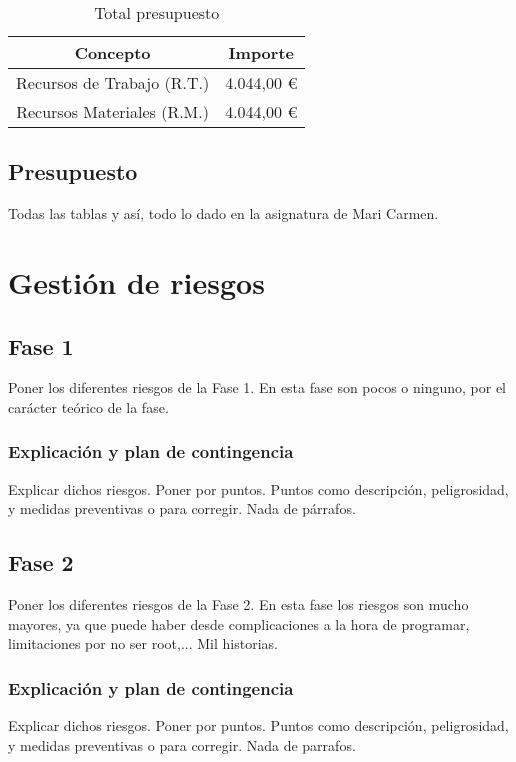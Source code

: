 \begin{table}[H]
	\centering
	\begin{tabular}{ |c|c| } 
		\hline
		Concepto & Importe \\
		\hline
		Recursos de Trabajo (R.T.) & 4.044,00 \euro \\
		Recursos Materiales (R.M.) & 4.044,00 \euro \\
		\hline
	\end{tabular}
	\caption{Total presupuesto}
	\label{table:total-presupuesto}
\end{table}

\subsection{Presupuesto}
{\color{red} Todas las tablas y así, todo lo dado en la asignatura de Mari Carmen.}


\section{Gestión de riesgos}

\subsection{Fase 1}
{\color{red} Poner los diferentes riesgos de la Fase 1. En esta fase son pocos o ninguno, por el carácter teórico de la fase.}

\subsubsection{Explicación y plan de contingencia}
{\color{red} Explicar dichos riesgos. Poner por puntos. Puntos como descripción, peligrosidad, y medidas preventivas o para corregir. Nada de párrafos.}

\subsection{Fase 2}
{\color{red} Poner los diferentes riesgos de la Fase 2. En esta fase los riesgos son mucho mayores, ya que puede haber desde complicaciones a la hora de programar, limitaciones por no ser root,... Mil historias.}

\subsubsection{Explicación y plan de contingencia}
{\color{red} Explicar dichos riesgos. Poner por puntos. Puntos como descripción, peligrosidad, y medidas preventivas o para corregir. Nada de parrafos.}

